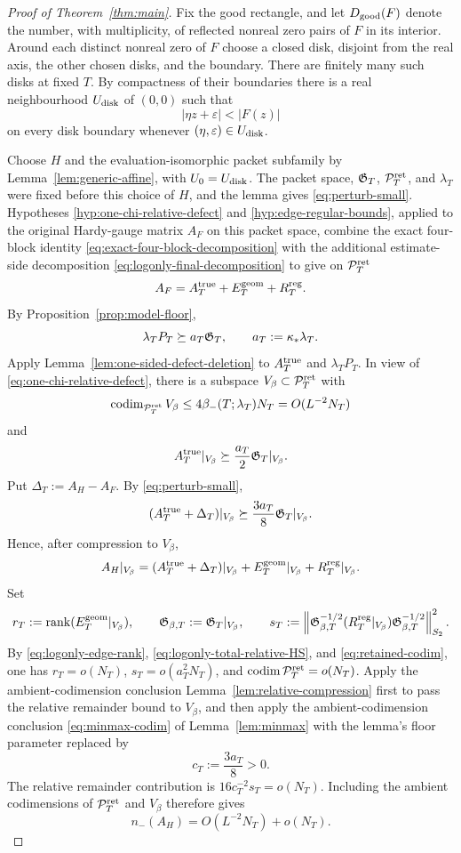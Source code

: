 \begin{proof}[Proof of Theorem~\ref{thm:main}]
Fix the good rectangle, and let $D_{\rm good}(F)$ denote the number, with
multiplicity, of reflected nonreal zero pairs of $F$ in its interior. Around
each distinct nonreal zero of $F$ choose a closed disk, disjoint from the real
axis, the other chosen disks, and the boundary. There are finitely many such
disks at fixed $T$. By compactness of their boundaries there is a real
neighbourhood $U_{\rm disk}$ of $(0,0)$ such that
\[
|\eta z+\varepsilon|<|F(z)|
\]
on every disk boundary whenever $(\eta,\varepsilon)\in U_{\rm disk}$.

Choose $H$ and the evaluation-isomorphic packet subfamily by
Lemma~\ref{lem:generic-affine}, with $U_0=U_{\rm disk}$.  The packet space,
$\mathfrak G_T$, $\mathcal P_T^{\rm ret}$, and $\lambda_T$ were fixed before this choice of $H$, and the
lemma gives
\eqref{eq:perturb-small}.  Hypotheses
\ref{hyp:one-chi-relative-defect} and
\ref{hyp:edge-regular-bounds}, applied to the original Hardy-gauge
matrix $A_F$ on this packet space, combine the exact four-block identity
\eqref{eq:exact-four-block-decomposition} with the additional estimate-side
decomposition \eqref{eq:logonly-final-decomposition} to give on $\mathcal P_T^{\rm ret}$
\[
A_F=A_T^{\rm true}+E_T^{\rm geom}+R_T^{\rm reg}.
\]
By Proposition~\ref{prop:model-floor},
\[
\lambda_TP_T\succeq a_T\mathfrak G_T,
\qquad a_T:=\kappa_*\lambda_T.
\]
Apply Lemma~\ref{lem:one-sided-defect-deletion} to
$A_T^{\rm true}$ and $\lambda_TP_T$.  In view of
\eqref{eq:one-chi-relative-defect}, there is a subspace
$V_\beta\subset\mathcal P_T^{\rm ret}$ with
\[
\operatorname{codim}_{\mathcal P_T^{\rm ret}}V_\beta
\le4\beta_-(T;\lambda_T)N_T=O(L^{-2}N_T)
\]
and
\[
A_T^{\rm true}|_{V_\beta}\succeq\frac{a_T}{2}
\mathfrak G_T|_{V_\beta}.
\]
Put $\Delta_T:=A_H-A_F$.  By \eqref{eq:perturb-small},
\[
(A_T^{\rm true}+\Delta_T)|_{V_\beta}
\succeq\frac{3a_T}{8}\mathfrak G_T|_{V_\beta}.
\]
Hence, after compression to $V_\beta$,
\[
A_H|_{V_\beta}=(A_T^{\rm true}+\Delta_T)|_{V_\beta}
+E_T^{\rm geom}|_{V_\beta}+R_T^{\rm reg}|_{V_\beta}.
\]
Set
\[
r_T:=\operatorname{rank}(E_T^{\rm geom}|_{V_\beta}),
\qquad
\mathfrak G_{\beta,T}:=\mathfrak G_T|_{V_\beta},
\qquad
s_T:=\left\|
\mathfrak G_{\beta,T}^{-1/2}(R_T^{\rm reg}|_{V_\beta})
\mathfrak G_{\beta,T}^{-1/2}
\right\|_{S_2}^2.
\]
By \eqref{eq:logonly-edge-rank},
\eqref{eq:logonly-total-relative-HS}, and
\eqref{eq:retained-codim}, one has
$r_T=o(N_T)$, $s_T=o(a_T^2N_T)$, and
$\operatorname{codim}\mathcal P_T^{\rm ret}=o(N_T)$. Apply the ambient-codimension conclusion
Lemma~\ref{lem:relative-compression} first to pass the relative remainder
bound to $V_\beta$, and then apply the ambient-codimension conclusion
\eqref{eq:minmax-codim} of Lemma~\ref{lem:minmax} with the lemma's floor
parameter replaced by
\[
c_T:=\frac{3a_T}{8}>0.
\]
The relative remainder contribution is
$16c_T^{-2}s_T=o(N_T)$.  Including the ambient codimensions of $\mathcal P_T^{\rm ret}$ and
$V_\beta$ therefore gives
\begin{equation}
\boxed{n_-(A_H)=O(L^{-2}N_T)+o(N_T).}
\label{eq:perturbed-inertia}
\end{equation}


\end{proof}
